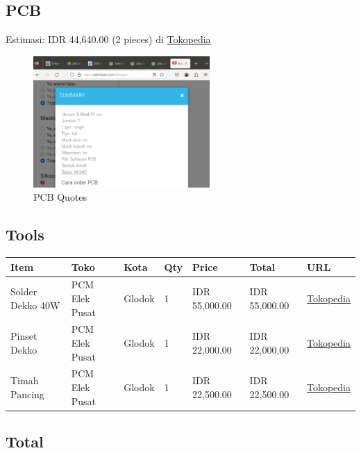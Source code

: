 \documentclass[a4paper,12pt,oneside,pdflatex,italian,final,twocolumn]{article}
\begin{document}
	\subsection{PCB}
	
	Estimasi: IDR 44,640.00 (2 pieces) di \href{https://www.tokopedia.com/raftech/jasa-cetak-pcb-general}{Tokopedia}
	
	\begin{figure}[h]
		\centering
		\includegraphics[width=0.6\textwidth]{images/pcb_quotes.png}
		\caption{PCB Quotes}
	\end{figure}
	
	\subsection{Tools}
	
	\begin{table}[!ht]
		\centering
		\begin{tabular}{|l|l|l|l|l|l|l|}
			\hline
			Item & Toko & Kota & Qty & Price & Total & URL \\ \hline
			Solder Dekko 40W & PCM Elek Pusat & Glodok & 1 & IDR 55,000.00 & IDR 55,000.00 & \href{https://www.tokopedia.com/pcmelektronik/soldering-solder-iron-dekko-deko-40w-40-watr}{Tokopedia} \\ \hline
			Pinset Dekko & PCM Elek Pusat & Glodok & 1 & IDR 22,000.00 & IDR 22,000.00 & \href{https://www.tokopedia.com/pcmelektronik/pinset-dekko-tekuk-bagus-ori}{Tokopedia} \\ \hline
			Timah Pancing & PCM Elek Pusat & Glodok & 1 & IDR 22,500.00 & IDR 22,500.00 & \href{https://www.tokopedia.com/pcmelektronik/timah-solder-1-rol-10-meter-merk-pancing}{Tokopedia} \\ \hline
		\end{tabular}
	\end{table}
	
	\subsection{Total}
	
\end{document}
